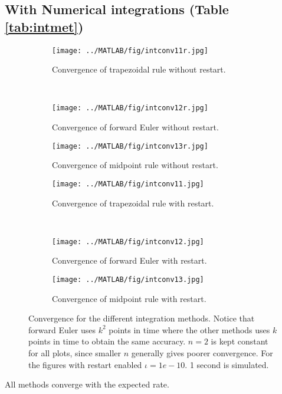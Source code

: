 \subsection{ With Numerical integrations (Table \ref{tab:intmet})}%
\begin{figure}[H]
        \centering
        \begin{subfigure}[b]{0.30\textwidth}
                \texttt{[image: ../MATLAB/fig/intconv11r.jpg]}
                \caption{ Convergence of trapezoidal rule without restart. }
                \label{fig:intconv11r}
        \end{subfigure}
        ~
        \begin{subfigure}[b]{0.30\textwidth}
                \texttt{[image: ../MATLAB/fig/intconv12r.jpg]}
                \caption{ Convergence of forward Euler without restart. }
                \label{fig:intconv12r}
        \end{subfigure}
        \begin{subfigure}[b]{0.30\textwidth}
                \texttt{[image: ../MATLAB/fig/intconv13r.jpg]}
                \caption{ Convergence of midpoint rule without restart. }
                \label{fig:intconv13r}
        \end{subfigure}         
        
        \begin{subfigure}[b]{0.30\textwidth}
                \texttt{[image: ../MATLAB/fig/intconv11.jpg]}
                \caption{ Convergence of trapezoidal rule with restart. }
                \label{fig:intconv11}
        \end{subfigure}
        ~
        \begin{subfigure}[b]{0.30\textwidth}
                \texttt{[image: ../MATLAB/fig/intconv12.jpg]}
                \caption{ Convergence of forward Euler with restart. }
                \label{fig:intconv12}
        \end{subfigure}
        \begin{subfigure}[b]{0.30\textwidth}
                \texttt{[image: ../MATLAB/fig/intconv13.jpg]}
                \caption{ Convergence of midpoint rule with restart. }
                \label{fig:intconv13}
        \end{subfigure}
        
 
\caption{ Convergence for the different integration methods. Notice that forward Euler uses $k^2$ points in time where the other methods uses $k$ points in time to obtain the same accuracy. $n=2$ is kept constant for all plots, since smaller $n$ generally gives poorer convergence. For the figures with restart enabled $\iota = 1e-10$. 1 second is simulated. }
\label{fig:intconv}
\end{figure}
\noindent All methods converge with the expected rate. \\


